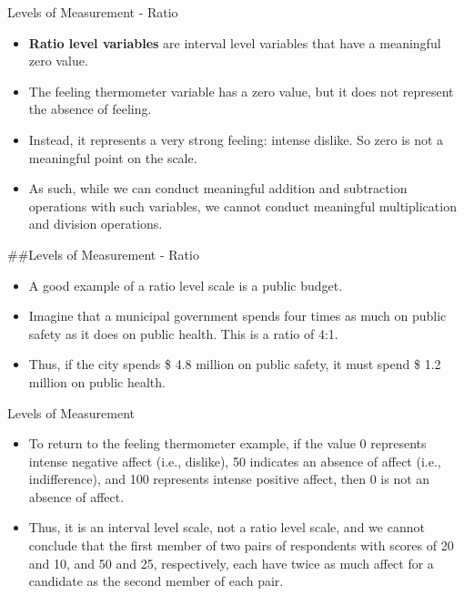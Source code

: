 \documentclass[
  ignorenonframetext,
]{beamer}
\begin{document}
\begin{frame}{Levels of Measurement - Ratio}
\protect\hypertarget{levels-of-measurement---ratio}{}

\begin{itemize}
\item
  \textbf{Ratio level variables} are interval level variables that have
  a meaningful zero value.
\item
  The feeling thermometer variable has a zero value, but it does not
  represent the absence of feeling.
\item
  Instead, it represents a very strong feeling: intense dislike. So zero
  is not a meaningful point on the scale.
\item
  As such, while we can conduct meaningful addition and subtraction
  operations with such variables, we cannot conduct meaningful
  multiplication and division operations.
\end{itemize}

\#\#Levels of Measurement - Ratio

\begin{itemize}
\item
  A good example of a ratio level scale is a public budget.
\item
  Imagine that a municipal government spends four times as much on
  public safety as it does on public health. This is a ratio of 4:1.
\item
  Thus, if the city spends \$ 4.8 million on public safety, it must
  spend \$ 1.2 million on public health.
\end{itemize}

\end{frame}

\begin{frame}{Levels of Measurement}
\protect\hypertarget{levels-of-measurement-1}{}

\begin{itemize}
\item
  To return to the feeling thermometer example, if the value 0
  represents intense negative affect (i.e., dislike), 50 indicates an
  absence of affect (i.e., indifference), and 100 represents intense
  positive affect, then 0 is not an absence of affect.
\item
  Thus, it is an interval level scale, not a ratio level scale, and we
  cannot conclude that the first member of two pairs of respondents with
  scores of 20 and 10, and 50 and 25, respectively, each have twice as
  much affect for a candidate as the second member of each pair.
\end{itemize}

\end{frame}
\end{document}
